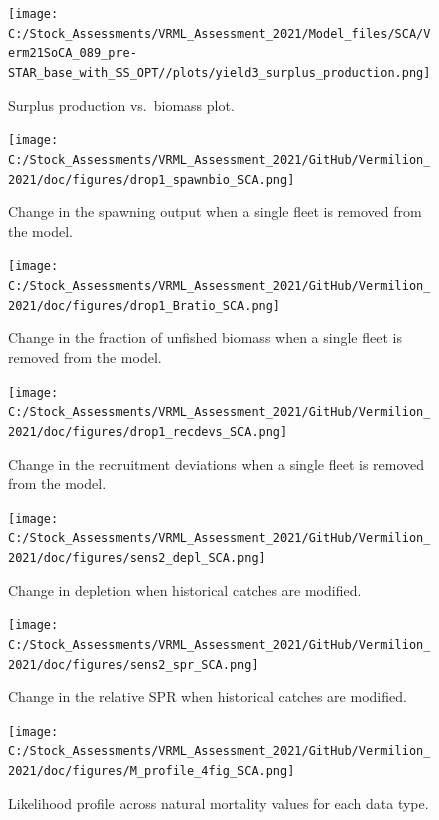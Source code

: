 \documentclass[11pt,
  english,
  a4paper,
]{article}
\begin{document}
\begin{figure}
\centering
\texttt{[image: C:/Stock\_Assessments/VRML\_Assessment\_2021/Model\_files/SCA/Verm21SoCA\_089\_pre-STAR\_base\_with\_SS\_OPT//plots/yield3\_surplus\_production.png]}
\caption{Surplus production vs.~biomass plot.\label{fig:yield3}}
\end{figure}

\FloatBarrier

\begin{figure}
\centering
\texttt{[image: C:/Stock\_Assessments/VRML\_Assessment\_2021/GitHub/Vermilion\_2021/doc/figures/drop1\_spawnbio\_SCA.png]}
\caption{Change in the spawning output when a single fleet is removed from the model.\label{fig:drop-spawnbio}}
\end{figure}

\begin{figure}
\centering
\texttt{[image: C:/Stock\_Assessments/VRML\_Assessment\_2021/GitHub/Vermilion\_2021/doc/figures/drop1\_Bratio\_SCA.png]}
\caption{Change in the fraction of unfished biomass when a single fleet is removed from the model.\label{fig:drop-bratio}}
\end{figure}

\begin{figure}
\centering
\texttt{[image: C:/Stock\_Assessments/VRML\_Assessment\_2021/GitHub/Vermilion\_2021/doc/figures/drop1\_recdevs\_SCA.png]}
\caption{Change in the recruitment deviations when a single fleet is removed from the model.\label{fig:drop-recdev}}
\end{figure}

\begin{figure}
\centering
\texttt{[image: C:/Stock\_Assessments/VRML\_Assessment\_2021/GitHub/Vermilion\_2021/doc/figures/sens2\_depl\_SCA.png]}
\caption{Change in depletion when historical catches are modified.\label{fig:sens2-depl}}
\end{figure}

\begin{figure}
\centering
\texttt{[image: C:/Stock\_Assessments/VRML\_Assessment\_2021/GitHub/Vermilion\_2021/doc/figures/sens2\_spr\_SCA.png]}
\caption{Change in the relative SPR when historical catches are modified.\label{fig:sens2-spr}}
\end{figure}

\begin{figure}
\centering
\texttt{[image: C:/Stock\_Assessments/VRML\_Assessment\_2021/GitHub/Vermilion\_2021/doc/figures/M\_profile\_4fig\_SCA.png]}
\caption{Likelihood profile across natural mortality values for each data type.\label{fig:m-profile}}
\end{figure}
\end{document}
